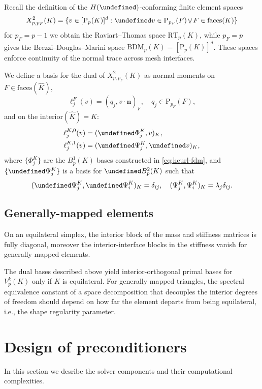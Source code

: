 \documentclass[review,onefignum,onetabnum,a4paper]{siamart190516}
\let\curl\undefined
\let\div\undefined
\let\tr\undefined
\DeclareMathOperator{\curl}{curl}
\DeclareMathOperator{\div}{div}
\DeclareMathOperator{\tr}{tr}
\DeclareMathOperator{\Forall}{\forall}
\newcommand{\Hdiv}{H(\div)}
\renewcommand{\vec}[1]{\mathbf{#1}}
\newcommand{\bn}{\vec{n}}
\newcommand{\Khat}{\hat{K}}
\renewcommand{\P}{\mathrm{P}}
\newcommand{\RT}{\mathrm{RT}}
\newcommand{\BDM}{\mathrm{BDM}}
\begin{document}
Recall the definition of the $\Hdiv$-conforming finite element spaces
\begin{equation}
   X^2_{p, p_F}(K) = \{v\in [\P_p(K)]^d : \tr v \in \P_{p_F}(F) \Forall F \in \text{faces}(K)  \}
\end{equation}
for $p_F=p-1$ we obtain the Raviart--Thomas space $\RT_p(K)$, while
$p_F=p$ gives the Brezzi--Douglas--Marini space $\BDM_p(K) = [\P_p(K)]^d$. 
These spaces enforce continuity of the normal trace across mesh interfaces.

We define a basis for the dual of $X^2_{p, p_F}(K)$ as normal moments on $F\in
\text{faces}(\Khat)$,
\begin{equation}
   \ell^F_j(v) = (q_j, v\cdot \bn)_F, \quad q_j \in \P_{p_F}(F),
\end{equation}
and on the $\text{interior}(\Khat) = K$: 
\begin{align}
   \ell^{K,0}_j(v) &= (\curl\Phi^K_j, v)_{K}, \\
   \ell^{K,1}_j(v) &= (\div\Psi^K_j, \div v)_{K}, \label{eq:hdiv-interior-dofs}
\end{align}
where $\{\Phi^K_j\}$ are the $B^1_p(K)$ bases constructed in
\eqref{eq:hcurl-fdm}, and $\{\div\Psi^K_j\}$ is a basis for $\div B^2_p(K)$ such that
\begin{equation} \label{eq:hdiv-fdm}
   (\div\Psi^K_j, \div\Psi^K_i)_K = \delta_{ij}, \quad
   (\Psi^K_j, \Psi^K_i)_{K} = \lambda_j\delta_{ij}.
\end{equation}



\subsection{Generally-mapped elements}

On an equilateral simplex, the interior block of the mass and stiffness matrices
is fully diagonal, moreover the interior-interface blocks in the stiffness 
vanish for generally mapped elements.

The dual bases described above yield interior-orthogonal primal bases for $V^k_p(K)$ only
if $K$ is equilateral. For generally mapped triangles, the spectral equivalence constant of
a space decomposition that decouples the interior degrees of freedom should depend on how
far the element departs from being equilateral, i.e., the shape regularity parameter. 



\section{Design of preconditioners}
In this section we desribe the solver components and their computational complexities.
\end{document}
